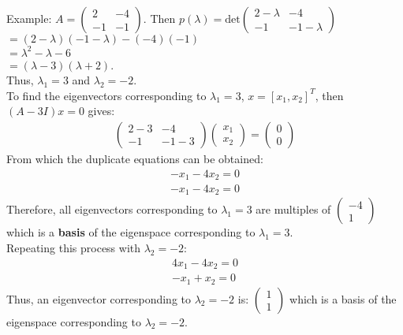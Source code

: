 \documentclass{report}
\begin{document}
Example:
$A = \begin{pmatrix}
2 & -4 \\
-1 & -1
\end{pmatrix}$. Then $p(\lambda)=\mbox{det}\begin{pmatrix}
2 - \lambda & -4 \\
-1 & -1 - \lambda
\end{pmatrix}$ \\
$= (2-\lambda)(-1-\lambda)-(-4)(-1)$ \\
$= \lambda^2 - \lambda - 6$ \\
$= (\lambda - 3)(\lambda + 2)$. \\
Thus, $\lambda_1=3$ and $\lambda_2=-2$. \\
To find the eigenvectors corresponding to $\lambda_1=3$, $x=[x_1, x_2]^T$, then $(A -3I)x = 0$ gives:\\
\begin{align*}
\begin{pmatrix}
2-3 & -4 \\
-1 & -1-3
\end{pmatrix} \begin{pmatrix}
x_1 \\
x_2
\end{pmatrix} = \begin{pmatrix}
0 \\
0
\end{pmatrix}
\end{align*}
From which the duplicate equations can be obtained:
\begin{align*}
-x_1-4x_2 = 0 \\
-x_1-4x_2 = 0
\end{align*}
Therefore, all eigenvectors corresponding to $\lambda_1=3$ are multiples of $\begin{pmatrix}
-4 \\
1
\end{pmatrix}$ which is a {\bf basis} of the eigenspace corresponding to $\lambda_1=3$.\\
Repeating this process with $\lambda_2=-2$:
\begin{align*}
4x_1-4x_2 = 0 \\
-x_1+x_2 = 0
\end{align*}
Thus, an eigenvector corresponding to $\lambda_2=-2$ is: $\begin{pmatrix}
1 \\
1
\end{pmatrix}$ which is a basis of the eigenspace corresponding to $\lambda_2=-2$.
\end{document}
